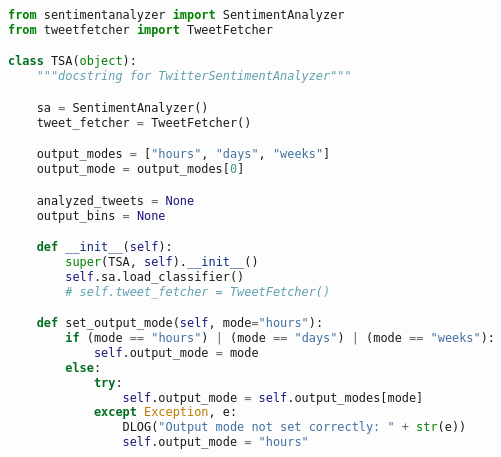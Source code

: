 \documentclass[Main]{subfiles}
\begin{document}
\begin{lstlisting}[language=Python]
from sentimentanalyzer import SentimentAnalyzer
from tweetfetcher import TweetFetcher

class TSA(object):
    """docstring for TwitterSentimentAnalyzer"""

    sa = SentimentAnalyzer()
    tweet_fetcher = TweetFetcher()

    output_modes = ["hours", "days", "weeks"]
    output_mode = output_modes[0]

    analyzed_tweets = None
    output_bins = None

    def __init__(self):
        super(TSA, self).__init__()
        self.sa.load_classifier()
        # self.tweet_fetcher = TweetFetcher()

    def set_output_mode(self, mode="hours"):
        if (mode == "hours") | (mode == "days") | (mode == "weeks"):
            self.output_mode = mode
        else:
            try:
                self.output_mode = self.output_modes[mode]
            except Exception, e:
                DLOG("Output mode not set correctly: " + str(e))
                self.output_mode = "hours"

\end{lstlisting}
\end{document}
